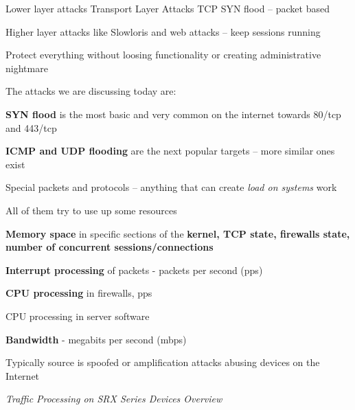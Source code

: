 \documentclass[Screen16to9,17pt]{foils}
\begin{document}

\begin{list2}
\item Lower layer attacks Transport Layer Attacks TCP SYN flood -- packet based
\item Higher layer attacks like Slowloris and web attacks -- keep sessions running
\item Protect everything without loosing functionality or creating administrative nightmare
\end{list2}


The attacks we are discussing today are:
\begin{list2}
\item {\bf SYN flood} is the most basic and very common on the internet towards 80/tcp and 443/tcp
\item {\bf ICMP and UDP flooding} are the next popular targets -- more similar ones exist
\item Special packets and protocols -- anything that can create \emph{load on systems} work
\item All of them try to use up some resources
\begin{list2}
\item {\bf Memory space} in specific sections of the {\bf kernel, TCP state, firewalls state, number of concurrent sessions/connections}
\item {\bf Interrupt processing} of packets - packets per second (pps)
\item {\bf CPU processing} in firewalls, pps
\item CPU processing in server software
\item {\bf Bandwidth} - megabits per second (mbps)
\item Typically source is spoofed or amplification attacks abusing devices on the Internet
\end{list2}
\end{list2}






\emph{Traffic Processing on SRX Series Devices Overview}\\ {\scriptsize
{}}
\end{document}
